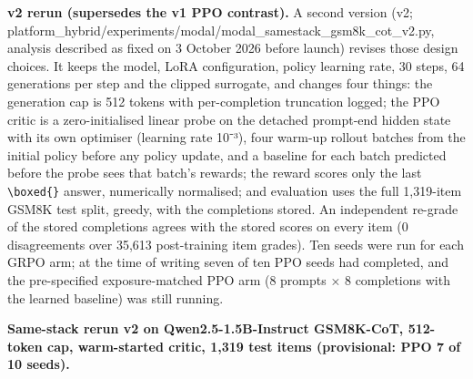 \documentclass[12pt,a4paper]{report}
\begin{document}
\textbf{v2 rerun (supersedes the v1 PPO contrast).} A second version
(v2;
platform\_hybrid/experiments/modal/modal\_\allowbreak{}samestack\_\allowbreak{}gsm8k\_\allowbreak{}cot\_\allowbreak{}v2.py,
analysis described as fixed on 3 October 2026 before launch) revises
those design choices. It keeps the model, LoRA configuration, policy
learning rate, 30 steps, 64 generations per step and the clipped
surrogate, and changes four things: the generation cap is 512 tokens
with per-completion truncation logged; the PPO critic is a
zero-initialised linear probe on the detached prompt-end hidden state
with its own optimiser (learning rate 10⁻³), four warm-up rollout
batches from the initial policy before any policy update, and a baseline
for each batch predicted before the probe sees that batch's rewards; the
reward scores only the last \texttt{\textbackslash{}boxed\{\}} answer,
numerically normalised; and evaluation uses the full 1,319-item GSM8K
test split, greedy, with the completions stored. An independent re-grade
of the stored completions agrees with the stored scores on every item (0
disagreements over 35,613 post-training item grades). Ten seeds were run
for each GRPO arm; at the time of writing seven of ten PPO seeds had
completed, and the pre-specified exposure-matched PPO arm (8 prompts × 8
completions with the learned baseline) was still running.

\textbf{Same-stack rerun v2 on Qwen2.5-1.5B-Instruct GSM8K-CoT,
512-token cap, warm-started critic, 1,319 test items (provisional: PPO 7
of 10 seeds).}
\end{document}
